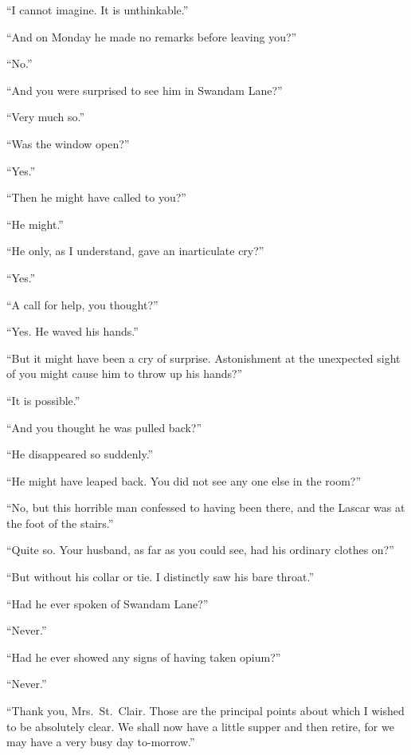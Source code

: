 “I cannot imagine. It is unthinkable.”

“And on Monday he made no remarks before leaving
you?”

“No.”

“And you were surprised to see him in Swandam Lane?”

“Very much so.”

“Was the window open?”

“Yes.”

“Then he might have called to you?”

“He might.”

“He only, as I understand, gave an inarticulate cry?”

“Yes.”

“A call for help, you thought?”

“Yes. He waved his hands.”

“But it might have been a cry of surprise. Astonishment
at the unexpected sight of you might cause him to throw up
his hands?”

“It is possible.”

“And you thought he was pulled back?”

“He disappeared so suddenly.”

“He might have leaped back. You did not see any one
else in the room?”

“No, but this horrible man confessed to having been there,
and the Lascar was at the foot of the stairs.”

“Quite so. Your husband, as far as you could see, had his
ordinary clothes on?”

“But without his collar or tie. I distinctly saw his bare
throat.”

“Had he ever spoken of Swandam Lane?”

“Never.”

“Had he ever showed any signs of having taken opium?”

“Never.”

“Thank you, Mrs.~St.~Clair. Those are the principal points
about which I wished to be absolutely clear. We shall now
have a little supper and then retire, for we may have a very
busy day to-morrow.”

